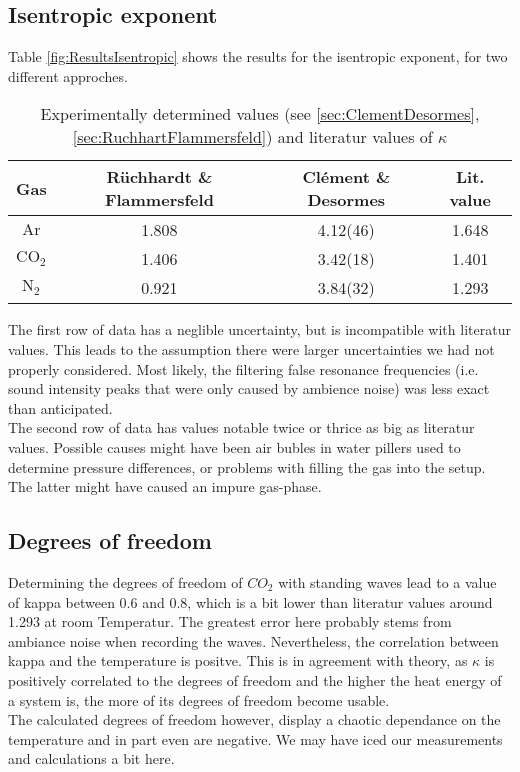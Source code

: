 \documentclass[../main.tex]{subfiles}
\begin{document}
    \subsection{Isentropic exponent}
        Table \ref{fig:ResultsIsentropic} shows the results for the isentropic exponent, for two different approches.
        \begin{table}[H]
            \centering
            \begin{tabular}{c|cc|c}
                \textbf{Gas} & \textbf{Rüchhardt \& Flammersfeld} & \textbf{Clément \& Desormes} & \textbf{Lit. value}\\
                \hline
                $\text{Ar}$ & 1.808 & 4.12(46)  & 1.648\\
                $\text{CO}_2$ & 1.406 & 3.42(18) & 1.401\\
                $\text{N}_2$ & 0.921 & 3.84(32) & 1.293\\
            \end{tabular}
            \caption{Experimentally determined values (see \ref{sec:ClementDesormes}, \ref{sec:RuchhartFlammersfeld}) and literatur values of $\kappa$}
            \label{tab:ResultsIsentropic}
        \end{table}
        \noindent The first row of data has a neglible uncertainty, but is incompatible with literatur values. This leads to the assumption there were larger uncertainties we had not properly considered. Most likely, the filtering false resonance frequencies (i.e. sound intensity peaks that were only caused by ambience noise) was less exact than anticipated.\\

        \noindent The second row of data has values notable twice or thrice as big as literatur values. Possible causes might have been air bubles in water pillers used to determine pressure differences, or problems with filling the gas into the setup. The latter might have caused an impure gas-phase.

    \subsection{Degrees of freedom}
        Determining the degrees of freedom of $\textit{CO}_2$ with standing waves lead to a value of kappa between $\num{0.6}$ and $\num{0.8}$, which is a bit lower than literatur values around 1.293 at room Temperatur. The greatest error here probably stems from ambiance noise when recording the waves. Nevertheless, the correlation between kappa and the temperature is positve. This is in agreement with theory, as $\kappa$ is positively correlated to the degrees of freedom and the higher the heat energy of a system is, the more of its degrees of freedom become usable.\\

        \noindent The calculated degrees of freedom however, display a chaotic dependance on the temperature and in part even are negative. We may have iced our measurements and calculations a bit here.
\end{document}
